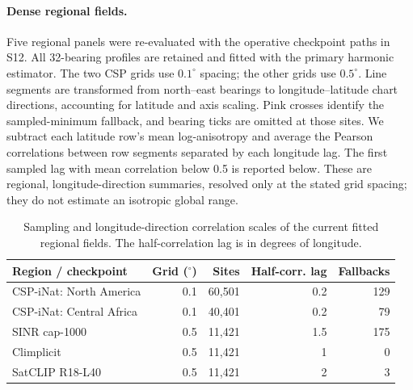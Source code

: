 \paragraph{Dense regional fields.} Five regional panels were re-evaluated with the operative checkpoint paths in S12. All 32-bearing profiles are retained and fitted with the primary harmonic estimator. The two CSP grids use $0.1^\circ$ spacing; the other grids use $0.5^\circ$. Line segments are transformed from north--east bearings to longitude--latitude chart directions, accounting for latitude and axis scaling. Pink crosses identify the sampled-minimum fallback, and bearing ticks are omitted at those sites. We subtract each latitude row's mean log-anisotropy and average the Pearson correlations between row segments separated by each longitude lag. The first sampled lag with mean correlation below 0.5 is reported below. These are regional, longitude-direction summaries, resolved only at the stated grid spacing; they do not estimate an isotropic global range.
\begin{table}[htbp]\centering\small
\caption{Sampling and longitude-direction correlation scales of the current fitted regional fields. The half-correlation lag is in degrees of longitude.}
\label{tab:dense}
\begin{tabular}{@{}lrrrr@{}}\toprule
Region / checkpoint&Grid ($^\circ$)&Sites&Half-corr. lag&Fallbacks\\\midrule
CSP-iNat: North America&0.1&60,501&0.2&129\\
CSP-iNat: Central Africa&0.1&40,401&0.2&79\\
SINR cap-1000&0.5&11,421&1.5&175\\
Climplicit&0.5&11,421&1&0\\
SatCLIP R18-L40&0.5&11,421&2&3\\
\bottomrule\end{tabular}
\end{table}
